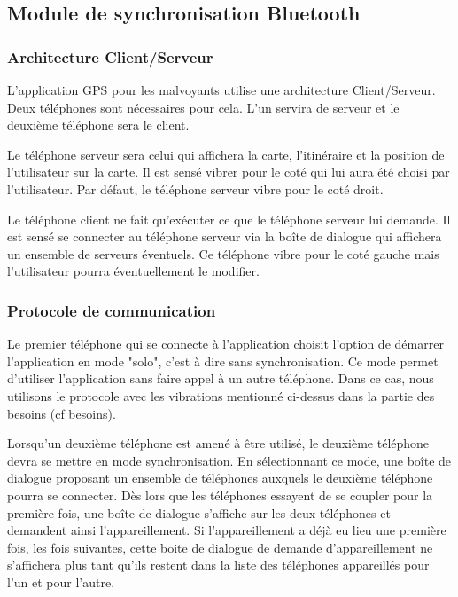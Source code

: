 \newpage
\subsection{Module de synchronisation Bluetooth}

\subsubsection{Architecture Client/Serveur}
L'application GPS pour les malvoyants utilise une architecture Client/Serveur. Deux téléphones sont nécessaires pour cela. L'un servira de serveur et le deuxième téléphone sera le client.

Le téléphone serveur sera celui qui affichera la carte, l'itinéraire et la position de l'utilisateur sur la carte. Il est sensé vibrer pour le coté qui lui aura été choisi par l'utilisateur. Par défaut, le téléphone serveur vibre pour le coté droit.

Le téléphone client ne fait qu'exécuter ce que le téléphone serveur lui demande. Il est sensé se connecter au téléphone serveur via la boîte de dialogue qui affichera un ensemble de serveurs éventuels. Ce téléphone vibre pour le coté gauche mais l'utilisateur pourra éventuellement le modifier.

\subsubsection{Protocole de communication}
Le premier téléphone qui se connecte à l'application choisit l'option de démarrer l'application en mode "solo", c'est à dire sans synchronisation. Ce mode permet d'utiliser l'application sans faire appel à un autre téléphone. Dans ce cas, nous utilisons le protocole avec les vibrations mentionné ci-dessus dans la partie des besoins (cf besoins).

Lorsqu'un deuxième téléphone est amené à être utilisé, le deuxième téléphone devra se mettre en mode synchronisation. En sélectionnant ce mode, une boîte de dialogue proposant un ensemble de téléphones auxquels le deuxième téléphone pourra se connecter. Dès lors que les téléphones essayent de se coupler pour la première fois, une boîte de dialogue s'affiche sur les deux téléphones et demandent ainsi l'appareillement. Si l'appareillement a déjà eu lieu une première fois, les fois suivantes, cette boite de dialogue de demande d'appareillement ne s'affichera plus tant qu'ils restent dans la liste des téléphones appareillés pour l'un et pour l'autre.


